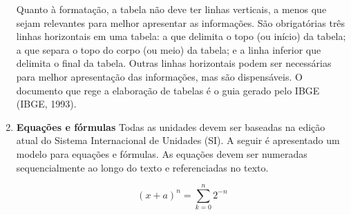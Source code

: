 \begin{enumerate}[label=\alph*)]
Quanto à formatação, a tabela não deve ter linhas verticais, a menos que sejam relevantes para melhor apresentar as informações. São obrigatórias três linhas horizontais em uma tabela: a que delimita o topo (ou início) da tabela; a que separa o topo do corpo (ou meio) da tabela; e a linha inferior que delimita o final da tabela. Outras linhas horizontais podem ser necessárias para melhor apresentação das informações, mas são dispensáveis. O documento que rege a elaboração de tabelas é o guia gerado pelo IBGE (IBGE, 1993).

\item {\bfseries Equações e fórmulas}
Todas as unidades devem ser baseadas na edição atual do Sistema Internacional de Unidades (SI). A seguir é apresentado um modelo para equações e fórmulas. As equações devem ser numeradas sequencialmente ao longo do texto e referenciadas no texto.

\begin{equation}
(x+a)^{n}=\sum_{k=0}^{n} 2^{-n}
\label{eqcargacap}
\end{equation}

\end{enumerate}

